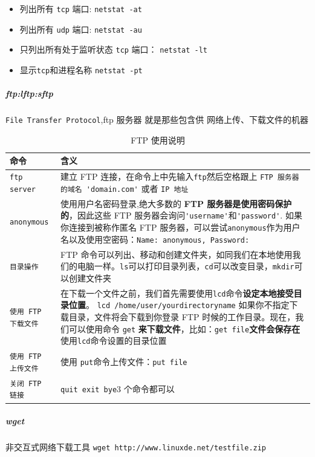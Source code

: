 \documentclass[UTF8,a4paper,12pt]{ctexbook}
\begin{document}
				\begin{itemize}[itemindent = 1em]
					\item 列出所有 \verb|tcp| 端口: \verb|netstat -at|
					\item 列出所有 \verb|udp| 端口: \verb|netstat -au|
					\item 只列出所有处于监听状态 \verb|tcp| 端口： \verb|netstat -lt|
					\item 显示\verb|tcp|和进程名称 \verb|netstat -pt|
				\end{itemize}
				
			\subparagraph{ftp:lftp:sftp} \verb|File Transfer Protocol|,ftp 服务器 就是那些包含供 网络上传、下载文件的机器
				\begin{table}[H]
					\centering
					\caption{FTP 使用说明}
					\begin{tabular}{l|m{13cm}}
						\hline
						命令 	   	   & 含义\\
						\hline
						\verb|ftp server|	&  建立 FTP 连接，在命令上中先输入\verb|ftp|然后空格跟上 \verb|FTP 服务器的域名 'domain.com'| 或者 \verb|IP 地址|\\
						\verb|anonymous|	 &  使用用户名密码登录,绝大多数的 \textbf{FTP 服务器是使用密码保护的}，因此这些 FTP 服务器会询问\verb|'username'|和\verb|'password'|.	如果你连接到被称作匿名 FTP 服务器，可以尝试\verb|anonymous|作为用户名以及使用空密码：\verb|Name: anonymous, Password:|\\
						\verb|目录操作|	 &  FTP 命令可以列出、移动和创建文件夹，如同我们在本地使用我们的电脑一样。\verb|ls|可以打印目录列表，\verb|cd|可以改变目录，\verb|mkdir|可以创建文件夹\\
						\verb|使用 FTP 下载文件|		&  在下载一个文件之前，我们首先需要使用\verb|lcd|命令\textbf{设定本地接受目录位置}。
						\verb|lcd /home/user/yourdirectoryname| 如果你不指定下载目录，文件将会下载到你登录 FTP 时候的工作目录。现在，我们可以使用命令 \verb|get| \textbf{来下载文件}，比如：\verb|get file|\textbf{文件会保存在}使用\verb|lcd|命令设置的目录位置\\
						\verb|使用 FTP 上传文件|	 &  使用 \verb|put|命令上传文件：\verb|put file|\\
						\verb|关闭 FTP 链接| &  \verb|quit exit bye|3 个命令都可以\\
						\hline
					\end{tabular}
				\end{table}	
				
			\subparagraph{wget} 非交互式网络下载工具 \verb|wget http://www.linuxde.net/testfile.zip|
			
\end{document}
